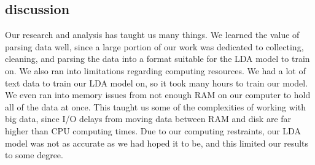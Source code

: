 \subsection{discussion}
Our research and analysis has taught us many things. We learned the value of parsing data well, since a large portion of our work was dedicated to collecting, cleaning, and parsing the data into a format suitable for the LDA model to train on. We also ran into limitations regarding computing resources. We had a lot of text data to train our LDA model on, so it took many hours to train our model. We even ran into memory issues from not enough RAM on our computer to hold all of the data at once. This taught us some of the complexities of working with big data, since I/O delays from moving data between RAM and disk are far higher than CPU computing times. Due to our computing restraints, our LDA model was not as accurate as we had hoped it to be, and this limited our results to some degree.




